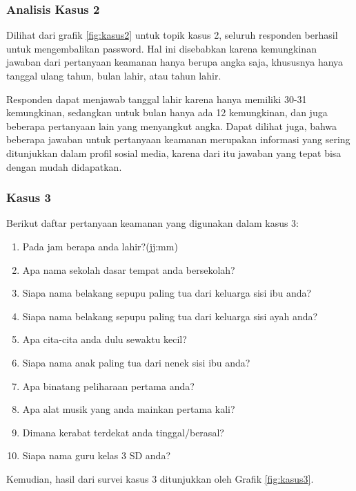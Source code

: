 \subsubsection{Analisis Kasus 2}

Dilihat dari grafik \ref{fig:kasus2} untuk topik kasus 2, seluruh responden berhasil untuk mengembalikan password. Hal ini disebabkan karena kemungkinan jawaban dari pertanyaan keamanan hanya berupa angka saja, khususnya hanya tanggal ulang tahun, bulan lahir, atau tahun lahir.

Responden dapat menjawab tanggal lahir karena hanya memiliki 30-31 kemungkinan, sedangkan untuk bulan hanya ada 12 kemungkinan, dan juga beberapa pertanyaan lain yang menyangkut angka. Dapat dilihat juga, bahwa beberapa jawaban untuk pertanyaan keamanan merupakan informasi yang sering ditunjukkan dalam profil sosial media, karena dari itu jawaban yang tepat bisa dengan mudah didapatkan.

\subsubsection{Kasus 3}

Berikut daftar pertanyaan keamanan yang digunakan dalam kasus 3:

\begin{enumerate}[itemsep=0mm]
	\item Pada jam berapa anda lahir?(jj:mm)
	\item Apa nama sekolah dasar tempat anda bersekolah?
	\item Siapa nama belakang sepupu paling tua dari keluarga sisi ibu anda?
	\item Siapa nama belakang sepupu paling tua dari keluarga sisi ayah anda?
	\item Apa cita-cita anda dulu sewaktu kecil?
	\item Siapa nama anak paling tua dari nenek sisi ibu anda?
	\item Apa binatang peliharaan pertama anda?
	\item Apa alat musik yang anda mainkan pertama kali?
	\item Dimana kerabat terdekat anda tinggal/berasal?
	\item Siapa nama guru kelas 3 SD anda?
\end{enumerate}

Kemudian, hasil dari survei kasus 3 ditunjukkan oleh Grafik \ref{fig:kasus3}.

